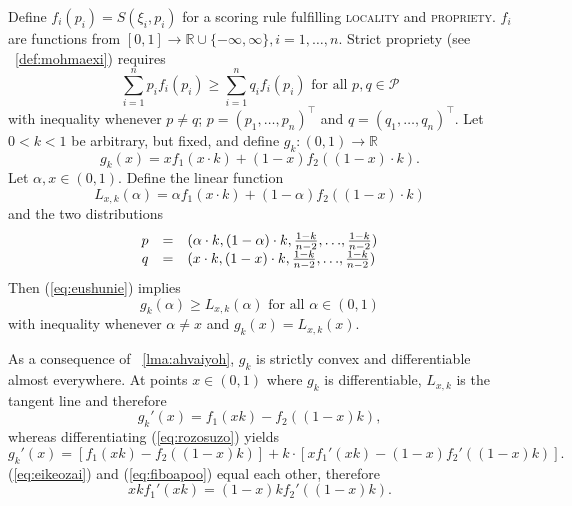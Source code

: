 \documentclass[12pt]{article}
\begin{document}
Define $f_{i}(p_{i})=S(\xi_{i},p_{i})$ for a scoring rule fulfilling
\textsc{locality} and \textsc{propriety}. $f_{i}$ are functions from
$[0,1]\rightarrow\mathbb{R}\cup\{-\infty,\infty\},i=1,{\ldots},n$.
Strict propriety (see {\efinition}~\ref{def:mohmaexi}) requires
\begin{equation}
  \label{eq:eushunie}
  \sum_{i=1}^{n}p_{i}f_{i}(p_{i})\geq\sum_{i=1}^{n}q_{i}f_{i}(p_{i})\mbox{ for all }p,q\in\mathcal{P}
\end{equation}
with inequality whenever $p\neq{}q$;
$p=(p_{1},{\ldots},p_{n})^{\intercal}$ and
$q=(q_{1},{\ldots},q_{n})^{\intercal}$. Let $0<k<1$ be arbitrary, but
fixed, and define $g_{k}:(0,1)\rightarrow\mathbb{R}$
\begin{equation}
  \label{eq:rozosuzo}
  g_{k}(x)=xf_{1}(x\cdot{}k)+(1-x)f_{2}((1-x)\cdot{}k).
\end{equation}
Let $\alpha,x\in(0,1)$. Define the linear function
\begin{equation}
  \label{eq:rangeenu}
L_{x,k}(\alpha)=\alpha{}f_{1}(x\cdot{}k)+(1-\alpha)f_{2}((1-x)\cdot{}k)
\end{equation}
and the two distributions
\begin{equation}
  \label{eq:ahsajohd}
  \begin{array}{rcl}
p&=&(\alpha\cdot{}k,(1-\alpha)\cdot{}k,\frac{1-k}{n-2},{\ldots},\frac{1-k}{n-2}) \\
q&=&(x\cdot{}k,(1-x)\cdot{}k,\frac{1-k}{n-2},{\ldots},\frac{1-k}{n-2})
  \end{array}\notag
\end{equation}
Then (\ref{eq:eushunie}) implies
\begin{equation}
  \label{eq:luophaek}
  g_{k}(\alpha)\geq{}L_{x,k}(\alpha)\mbox{ for all }\alpha\in(0,1)
\end{equation}
with inequality whenever $\alpha\neq{}x$ and $g_{k}(x)=L_{x,k}(x)$.

As a consequence of {\emma}~\ref{lma:ahvaiyoh}, $g_{k}$ is strictly
convex and differentiable almost everywhere. At points $x\in(0,1)$
where $g_{k}$ is differentiable, $L_{x,k}$ is the tangent line and
therefore
\begin{equation}
  \label{eq:eikeozai}
  g_{k}'(x)=f_{1}(xk)-f_{2}((1-x)k),
\end{equation}
whereas differentiating (\ref{eq:rozosuzo}) yields
\begin{equation}
  \label{eq:fiboapoo}
  g_{k}'(x)=\left[f_{1}(xk)-f_{2}((1-x)k)\right]+k\cdot\left[xf_{1}'(xk)-(1-x)f_{2}'((1-x)k)\right].
\end{equation}
(\ref{eq:eikeozai}) and (\ref{eq:fiboapoo}) equal each other,
therefore
\begin{equation}
  \label{eq:eetaehah}
  xkf_{1}'(xk)=(1-x)kf_{2}'((1-x)k).
\end{equation}
\end{document}
